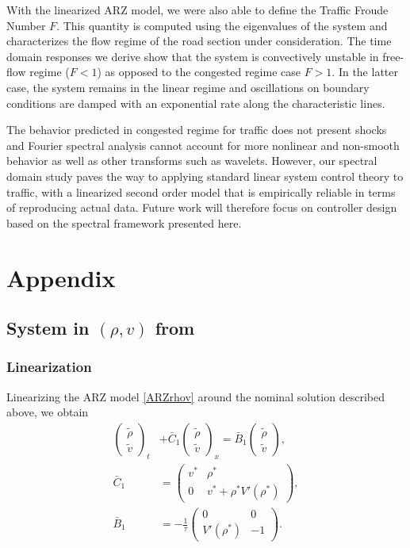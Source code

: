 \documentclass[a4paper, 10pt, conference]{ieeeconf}      %
\begin{document}
With the linearized ARZ model, we were also able to define the Traffic Froude Number $F$. This quantity is computed using the eigenvalues of the system and characterizes the flow regime of the road section under consideration. The time domain responses we derive show that the system is convectively unstable in free-flow regime ($F < 1$) as opposed to the congested regime case $F>1$. In the latter case, the system remains in the linear regime and oscillations on boundary conditions are damped with an exponential rate along the characteristic lines.

The behavior predicted in congested regime for traffic does not present shocks and Fourier spectral analysis cannot account for more nonlinear and non-smooth behavior as well as other transforms such as wavelets. However, our spectral domain study paves the way to applying standard linear system control theory to traffic, with a linearized second order model that is empirically reliable in terms of reproducing actual data. Future work will therefore focus on controller design based on the spectral framework presented here.



\newpage
\section*{Appendix}

\subsection{System in $(\rho, v)$ from}

\subsubsection{Linearization}
Linearizing the ARZ model \eqref{ARZrhov} around the nominal solution described above, we obtain
{\footnotesize
\begin{subequations} \label{rhovlin}
\begin{align}
\begin{pmatrix}
	\tilde{\rho} \\
	\tilde{v}
\end{pmatrix}_t
&+ \bar{C}_1
\begin{pmatrix}
	\tilde{\rho} \\ 
	\tilde{v}
\end{pmatrix}_x 
= 
\bar{B}_1
\begin{pmatrix}
	\tilde{\rho} \\
	\tilde{v}
\end{pmatrix}, \\
\bar{C}_1
&= 
\begin{pmatrix}
	v^* & \rho^* \\
	0 & v^* + \rho^* V' ( \rho^*) 
\end{pmatrix}, \\
\bar{B}_1 
&= 
-\frac{1}{\tau}
\begin{pmatrix}
	0 & 0 \\
	V'\left( \rho^{*} \right) & -1
\end{pmatrix}.
\end{align}
\end{subequations}
}
\end{document}
